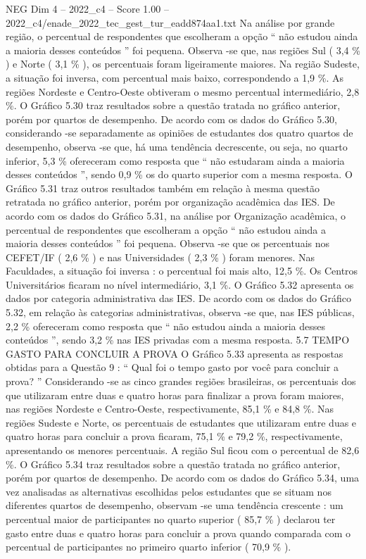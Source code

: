 \begin{textsample}{NEG Dim 4 – 2022\_c4 – Score 1.00 – 2022\_c4/enade\_2022\_tec\_gest\_tur\_eadd874aa1.txt}
Na análise por grande região, o percentual de respondentes que escolheram a opção “ não estudou ainda a maioria desses conteúdos ” foi pequena.
Observa -se que, nas regiões Sul ( 3,4 \% ) e Norte ( 3,1 \% ), os percentuais foram ligeiramente maiores.
Na região Sudeste, a situação foi inversa, com percentual mais baixo, correspondendo a 1,9 \%.
As regiões Nordeste e Centro-Oeste obtiveram o mesmo percentual intermediário, 2,8 \%.
O Gráfico 5.30 traz resultados sobre a questão tratada no gráfico anterior, porém por quartos de desempenho.
De acordo com os dados do Gráfico 5.30, considerando -se separadamente as opiniões de estudantes dos quatro quartos de desempenho, observa -se que, há uma tendência decrescente, ou seja, no quarto inferior, 5,3 \% ofereceram como resposta que “ não estudaram ainda a maioria desses conteúdos ”, sendo 0,9 \% os do quarto superior com a mesma resposta.
O Gráfico 5.31 traz outros resultados também em relação à mesma questão retratada no gráfico anterior, porém por organização acadêmica das IES.
De acordo com os dados do Gráfico 5.31, na análise por Organização acadêmica, o percentual de respondentes que escolheram a opção “ não estudou ainda a maioria desses conteúdos ” foi pequena.
Observa -se que os percentuais nos CEFET/IF ( 2,6 \% ) e nas Universidades ( 2,3 \% ) foram menores.
Nas Faculdades, a situação foi inversa : o percentual foi mais alto, 12,5 \%.
Os Centros Universitários ficaram no nível intermediário, 3,1 \%.
O Gráfico 5.32 apresenta os dados por categoria administrativa das IES.
De acordo com os dados do Gráfico 5.32, em relação às categorias administrativas, observa -se que, nas IES públicas, 2,2 \% ofereceram como resposta que “ não estudou ainda a maioria desses conteúdos ”, sendo 3,2 \% nas IES privadas com a mesma resposta. 5.7 TEMPO GASTO PARA CONCLUIR A PROVA O Gráfico 5.33 apresenta as respostas obtidas para a Questão 9 : “ Qual foi o tempo gasto por você para concluir a prova? ” Considerando -se as cinco grandes regiões brasileiras, os percentuais dos que utilizaram entre duas e quatro horas para finalizar a prova foram maiores, nas regiões Nordeste e Centro-Oeste, respectivamente, 85,1 \% e 84,8 \%.
Nas regiões Sudeste e Norte, os percentuais de estudantes que utilizaram entre duas e quatro horas para concluir a prova ficaram, 75,1 \% e 79,2 \%, respectivamente, apresentando os menores percentuais.
A região Sul ficou com o percentual de 82,6 \%.
O Gráfico 5.34 traz resultados sobre a questão tratada no gráfico anterior, porém por quartos de desempenho.
De acordo com os dados do Gráfico 5.34, uma vez analisadas as alternativas escolhidas pelos estudantes que se situam nos diferentes quartos de desempenho, observam -se uma tendência crescente : um percentual maior de participantes no quarto superior ( 85,7 \% ) declarou ter gasto entre duas e quatro horas para concluir a prova quando comparada com o percentual de participantes no primeiro quarto inferior ( 70,9 \% ).

\end{textsample}
